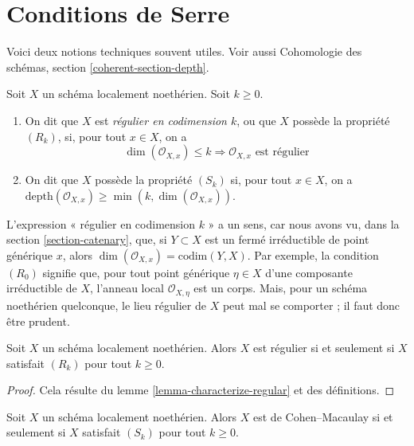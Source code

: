 \section{Conditions de Serre}
\label{section-Rk}

\noindent
Voici deux notions techniques souvent utiles.
Voir aussi Cohomologie des schémas, section \ref{coherent-section-depth}.

\begin{definition}
\label{definition-Rk}
Soit $X$ un schéma localement noethérien. Soit $k \geq 0$.
\begin{enumerate}
\item On dit que $X$ est {\it régulier en codimension $k$},
ou que $X$ possède la propriété {\it $(R_k)$}, si, pour tout $x \in X$,
on a
$$
\dim(\mathcal{O}_{X, x}) \leq k
\Rightarrow
\mathcal{O}_{X, x}\text{ est régulier}
$$
\item On dit que $X$ possède la propriété {\it $(S_k)$} si, pour tout $x \in X$, on a
$\text{depth}(\mathcal{O}_{X, x}) \geq \min(k, \dim(\mathcal{O}_{X, x}))$.
\end{enumerate}
\end{definition}

\noindent
L'expression « régulier en codimension $k$ » a un sens, car nous avons vu,
dans la section \ref{section-catenary}, que, si $Y \subset X$ est un fermé
irréductible de point générique $x$, alors
$\dim(\mathcal{O}_{X, x}) = \text{codim}(Y, X)$. Par exemple, la condition
$(R_0)$ signifie que, pour tout point générique $\eta \in X$ d'une composante
irréductible de $X$, l'anneau local $\mathcal{O}_{X, \eta}$ est un corps.
Mais, pour un schéma noethérien quelconque, le lieu régulier
de $X$ peut mal se comporter ; il faut donc être prudent.

\begin{lemma}
\label{lemma-scheme-regular-iff-all-Rk}
Soit $X$ un schéma localement noethérien.
Alors $X$ est régulier si et seulement si $X$ satisfait $(R_k)$ pour tout $k \geq 0$.
\end{lemma}

\begin{proof}
Cela résulte du lemme \ref{lemma-characterize-regular} et des définitions.
\end{proof}

\begin{lemma}
\label{lemma-scheme-CM-iff-all-Sk}
Soit $X$ un schéma localement noethérien.
Alors $X$ est de Cohen--Macaulay si et seulement si $X$ satisfait $(S_k)$ pour tout $k \geq 0$.
\end{lemma}

